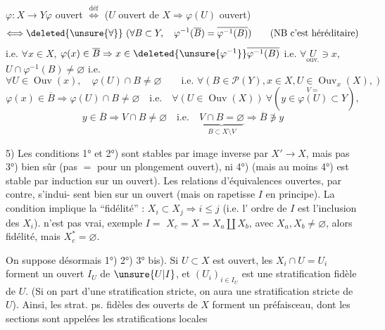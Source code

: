 $\varphi:X\longrightarrow Y$\qquad $\varphi$ ouvert $\overset{\mathrm{déf}}\Longleftrightarrow$ ($U$ ouvert de $X\Rightarrow\varphi(U)$ ouvert)
\[
\Longleftrightarrow\deleted{\unsure{\forall}}\ (\forall B\subset Y,\quad\varphi^{-1}(\overline B)=\overline{\varphi^{-1}(B)})
\qquad(\text{NB c'est héréditaire})
\]
i.e. $\forall x\in X$, $\varphi(x)\in\overline B\Rightarrow x\in\deleted{\unsure{\varphi^{-1}}}\overline{\varphi^{-1}(B)}$
i.e. $\forall\underset{\mathrm{ouv.}}{U}\ni x$, $U\cap\varphi^{-1}(B)\ne\varnothing$ i.e.
\[
\forall U\in\operatorname{Ouv}(x),\quad\varphi(U)\cap B\ne\varnothing
\qquad\text{i.e. }\forall(B\in\mathcal P(Y),x\in X,U\in\operatorname{Ouv}_x(X),)
\]
\[
\varphi(x)\in\overline B\Rightarrow\varphi(U)\cap B\ne\varnothing\quad\text{i.e.}\quad
\forall(U\in\operatorname{Ouv}(X))\ \forall(y\in\overset{V=}{\varphi(U)}\subset Y),
\]
\[
y\in\overline B\Rightarrow V\cap B\ne\varnothing\quad\text{i.e.}\quad
\underbrace{V\cap B=\varnothing}_{B\subset X\setminus V}\Rightarrow\overline B\not\ni y
\]

5) Les conditions 1° et 2°) sont stables par image inverse
par $X'\longrightarrow X$, mais pas 3°) bien sûr (pas $=$ pour
un plongement ouvert), ni 4°) (mais au moins
4°) est stable par induction sur un ouvert). Les
relations d'équivalences ouvertes, par contre, s'indui-
sent bien sur un ouvert (mais on rapetisse $I$
en principe). 
La condition 
implique la ``fidélité'' : $X_i\subset X_j\Rightarrow i\leq j$ (i.e. l'
ordre de $I$ est l'inclusion des $X_i$). 
n'est pas vrai, exemple $I=$
$X_c=X=X_a\amalg X_b$,  avec $X_a,X_b\ne\varnothing$, alors 
fidélité,  mais $X_c^*=\varnothing$.

On suppose désormais 1°) 2°) 3° bis). Si $U\subset X$
est ouvert, les  $X_i\cap U=U_i$  \inserted{$\ne\varnothing$} forment un
ouvert $I_U$ de $\unsure{U|I}$, et $(U_i)_{i\in I_U}$ est une
stratification fidèle de $U$. (Si on part d'une
stratification stricte, on aura une stratification
stricte de $U$). Ainsi, les strat. ps. fidèles des
ouverts de $X$ forment un préfaisceau, dont les
sections sont appelées les stratifications locales

